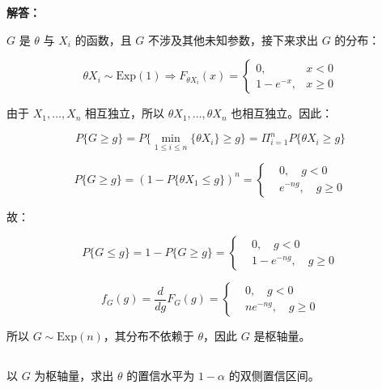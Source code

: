 \documentclass[12pt,a4paper]{article}
\begin{document}
\begin{answerbox}

\textbf{解答：}

$G$ 是 $\theta$ 与 $X_i$ 的函数，且 $G$ 不涉及其他未知参数，接下来求出 $G$ 的分布：

$$
\theta X_i \sim \text{Exp}(1) \Rightarrow F_{\theta X_i}(x) = \left\{\begin{array}{ll}
0, & x < 0 \\
1 - e^{-x}, & x \geq 0
\end{array}\right.
$$

由于 $X_1, \ldots, X_n$ 相互独立，所以 $\theta X_1, \ldots, \theta X_n$ 也相互独立。因此：

$$
P\{G \geq g\} = P\{\min_{1\leq i \leq n} \{\theta X_i\} \geq g\} = \Pi_{i=1}^{n} P\{\theta X_i \geq g\} 
$$

$$
P\{G \geq g\} = (1 - P\{\theta X_1 \leq g\})^n = \left\{\begin{aligned}
& 0, \quad g < 0 \\
& e^{-ng}, \quad g \geq 0
\end{aligned} \right.
$$

故：

$$
P\{G \leq g\} = 1 - P\{G \geq g\} = \left\{\begin{aligned}
& 0, \quad g < 0 \\
& 1 - e^{-ng}, \quad g \geq 0
\end{aligned}\right.
$$

$$
f_G(g) = \frac{d}{dg}F_G(g) = \left\{\begin{aligned}
& 0, \quad g < 0 \\
& ne^{-ng}, \quad g \geq 0
\end{aligned}\right.
$$

所以 $G \sim \text{Exp}(n)$，其分布不依赖于 $\theta$，因此 $G$ 是枢轴量。

\end{answerbox}

\subsection{}

以 $G$ 为枢轴量，求出 $\theta$ 的置信水平为 $1-\alpha$ 的双侧置信区间。
\end{document}
